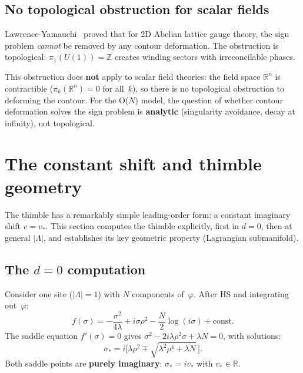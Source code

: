 \documentclass[12pt]{article}
\theoremstyle{definition}
\theoremstyle{remark}
\newcommand{\R}{\mathbb{R}}
\newcommand{\Z}{\mathbb{Z}}
\newcommand{\ph}{\varphi}
\newcommand{\La}{\Lambda}
\begin{document}
\subsection{No topological obstruction for scalar fields}

Lawrence-Yamauchi~\cite{LY24} proved that for 2D Abelian lattice
gauge theory, the sign problem \emph{cannot} be removed by any
contour deformation. The obstruction is topological: $\pi_1(U(1))=\Z$
creates winding sectors with irreconcilable phases.

This obstruction does \textbf{not} apply to scalar field theories:
the field space $\R^n$ is contractible ($\pi_k(\R^n) = 0$ for
all~$k$), so there is no topological obstruction to deforming
the contour. For the O($N$) model, the question of whether
contour deformation solves the sign problem is \textbf{analytic}
(singularity avoidance, decay at infinity), not topological.

\section{The constant shift and thimble geometry}
\label{sec:constant_shift}

The thimble has a remarkably simple leading-order form: a constant
imaginary shift $v = v_*$. This section computes the thimble
explicitly, first in $d = 0$, then at general $|\La|$, and
establishes its key geometric property (Lagrangian submanifold).

\subsection{The $d = 0$ computation}

Consider one site ($|\La|=1$) with $N$ components of~$\ph$.
After HS and integrating out~$\ph$:
\begin{equation}\label{eq:f_d0}
  f(\sigma) = -\frac{\sigma^2}{4\lambda} + i\sigma \rho^2
    - \frac{N}{2}\log(i\sigma) + \text{const}.
\end{equation}
The saddle equation $f'(\sigma) = 0$ gives
$\sigma^2 - 2i\lambda \rho^2\sigma + \lambda N = 0$, with solutions:
\begin{equation}
  \sigma_* = i\bigl[\lambda \rho^2 \mp \sqrt{\lambda^2 \rho^4 + \lambda N}\,\bigr].
\end{equation}
Both saddle points are \textbf{purely imaginary}: $\sigma_* = iv_*$
with $v_* \in \R$.
\end{document}
